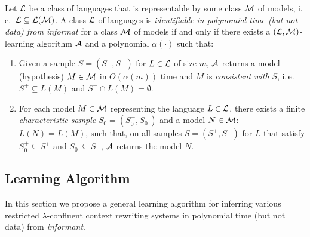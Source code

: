 \begin{definition}\label{definition:identification3}
Let $\textup{\sf $\mathcal{L}$}$ be a class of languages that is representable by some class $\textup{\sf $\mathcal{M}$}$ of models, i.\,e.\  $\textup{\sf $\mathcal{L}$} \subseteq {\cal L}(\textup{\sf $\mathcal{M}$})$. A class $\textup{\sf $\mathcal{L}$}$ of languages is \emph{identifiable in polynomial time (but not data) from informat} for a class $\textup{\sf $\mathcal{M}$}$ of models if and only if there exists a $(\textup{\sf $\mathcal{L}$}, \textup{\sf $\mathcal{M}$})$-learning algorithm $\textup{\sf $\mathcal{A}$}$ and a polynomial $\alpha(\cdot)$ such that:
\begin{enumerate}
\item\label{relaxed-polynomial1} Given a sample $S = (S^+, S^-)$ for $L \in \textup{\sf $\mathcal{L}$}$ of size $m$, $\textup{\sf $\mathcal{A}$}$ returns a model (hypothesis) $M \in \textup{\sf $\mathcal{M}$}$ in $O(\alpha(m))$ time and $M$ is \emph{consistent with} $S$, i.\,e.\ $S^+ \subseteq L(M)$ and $S^- \cap L(M) = \emptyset$.

\item\label{relaxed-polynomial2} For each model $M \in \textup{\sf $\mathcal{M}$}$ representing the language $L \in \textup{\sf $\mathcal{L}$}$, there exists a finite \emph{characteristic sample} $S_0 = (S_0^+, S_0^-)$ and a model $N \in \textup{\sf $\mathcal{M}$}$: $L(N) = L(M)$, such that, on all samples $S = (S^+, S^-)$ for $L$ that satisfy $S_0^+ \subseteq S^+$ and $S_0^- \subseteq S^-$, $\textup{\sf $\mathcal{A}$}$ returns the model $N$.
\end{enumerate}
\end{definition}

\subsection{Learning Algorithm}\label{section:algorithm}

In this section we propose a general learning algorithm for inferring various restricted $\lambda$-confluent context rewriting systems in polynomial time (but not data) from \emph{informant}.

